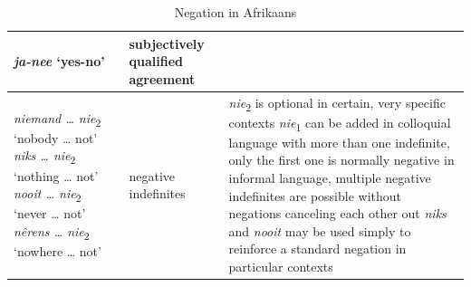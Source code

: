 \documentclass[output=paper,colorlinks,citecolor=brown]{langscibook}
\begin{document}
\begin{table}
\begin{tabularx}{\textwidth}{p{2cm}QQ}
\textit{ja-nee} ‘yes-no’ & subjectively qualified agreement & \\
\midrule

\textit{niemand … nie}\textsubscript{2} ‘nobody … not’
\newline \textit{niks … nie}\textsubscript{2} ‘nothing … not’
\newline \textit{nooit … nie}\textsubscript{2} ‘never … not’
\newline \textit{nêrens … nie}\textsubscript{2} ‘nowhere … not’
&
{negative indefinites}
&
\textit{nie}\textsubscript{2} is optional in certain, very specific contexts
\newline \textit{nie}\textsubscript{1} can be added in colloquial language
\newline with more than one indefinite, only the first one is normally negative
\newline in informal language, multiple negative indefinites are possible without negations canceling each other out
\newline \textit{niks} and \textit{nooit} may be used simply to reinforce a standard negation in particular contexts \\
\midrule
\end{tabularx}
\caption{Negation in Afrikaans}
\label{tab:afr:1}
\end{table}
\end{document}
